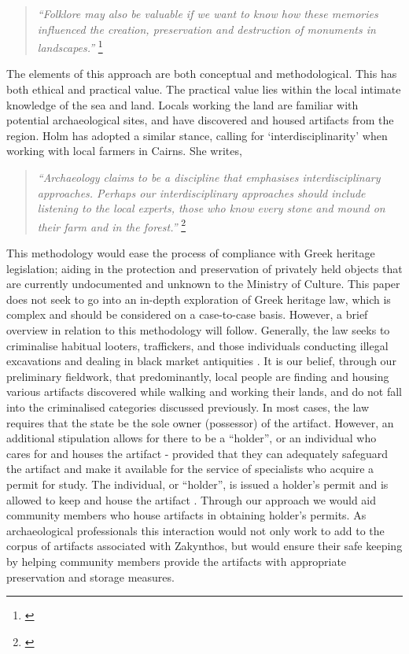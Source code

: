 	\blockquote{\textit{“Folklore may also be valuable if we want to know how these memories influenced the creation, preservation and destruction of monuments in landscapes.”}
		\footnote{\textcite[15]{Gazin-Schwartz_1999}}}
	The elements of this approach are both conceptual and methodological. This has both ethical and practical value. The practical value lies within the local intimate knowledge of the sea and land. Locals working the land are familiar with potential archaeological sites, and have discovered and housed artifacts from the region. Holm has adopted a similar stance, calling for ‘interdisciplinarity’ when working with local farmers in Cairns. She writes,
	
	\blockquote{\textit{“Archaeology claims to be a discipline that emphasises interdisciplinary approaches. Perhaps our interdisciplinary approaches should include listening to the local experts, those who know every stone and mound on their farm and in the forest.”}
		\footnote{\textcite[227]{Holm_1999}}}
	This methodology would ease the process of compliance with Greek heritage legislation; aiding in the protection and preservation of privately held objects that are currently undocumented and unknown to the Ministry of Culture. This paper does not seek to go into an in-depth exploration of Greek heritage law, which is complex and should be considered on a case-to-case basis. However, a brief overview in relation to this methodology will follow. Generally, the law seeks to criminalise habitual looters, traffickers, and those individuals conducting illegal excavations and dealing in black market antiquities \parencite{Kaliampetsos_2008}. It is our belief, through our preliminary fieldwork, that predominantly, local people are finding and housing various artifacts discovered while walking and working their lands, and do not fall into the criminalised categories discussed previously. In most cases, the law requires that the state be the sole owner (possessor) of the artifact. However, an additional stipulation allows for there to be a “holder”, or an individual who cares for and houses the artifact - provided that they can adequately safeguard the artifact and make it available for the service of specialists who acquire a permit for study. The individual, or “holder”, is issued a holder’s permit and is allowed to keep and house the artifact \parencite{Kaliampetsos_2008}. Through our approach we would aid community members who house artifacts in obtaining holder’s permits. As archaeological professionals this interaction would not only work to add to the corpus of artifacts associated with Zakynthos, but would ensure their safe keeping by helping community members provide the artifacts with appropriate preservation and storage measures. 
	
